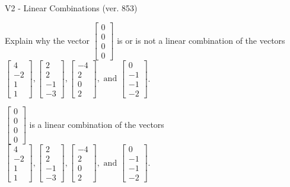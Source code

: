 \begin{exercise}
  \begin{exerciseTitle}V2 - Linear Combinations (ver. 853)\end{exerciseTitle}
  \begin{exerciseStatement}
    Explain why the vector \(\left[\begin{array}{c}
0 \\
0 \\
0 \\
0
\end{array}\right]\)  is or is not a linear 
	combination of the vectors \(\left[\begin{array}{c}
4 \\
-2 \\
1 \\
1
\end{array}\right] , \left[\begin{array}{c}
2 \\
2 \\
-1 \\
-3
\end{array}\right] , \left[\begin{array}{c}
-4 \\
2 \\
0 \\
2
\end{array}\right] , \text{ and } \left[\begin{array}{c}
0 \\
-1 \\
-1 \\
-2
\end{array}\right]\).
	


  \end{exerciseStatement}
  \begin{exerciseAnswer}
   \(\left[\begin{array}{c}
0 \\
0 \\
0 \\
0
\end{array}\right]\) 
  	 is  
	a linear combination of the vectors \(\left[\begin{array}{c}
4 \\
-2 \\
1 \\
1
\end{array}\right] , \left[\begin{array}{c}
2 \\
2 \\
-1 \\
-3
\end{array}\right] , \left[\begin{array}{c}
-4 \\
2 \\
0 \\
2
\end{array}\right] , \text{ and } \left[\begin{array}{c}
0 \\
-1 \\
-1 \\
-2
\end{array}\right]\).


\end{exerciseAnswer}
\end{exercise}
